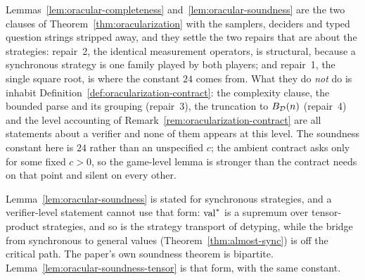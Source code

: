 \begin{remark}
\label{rem:oracular-game-level}
Lemmas~\ref{lem:oracular-completeness} and~\ref{lem:oracular-soundness} are the two clauses of
Theorem~\ref{thm:oracularization} with the samplers, deciders and typed question strings
stripped away, and they settle the two repairs that are about the strategies: repair~2, the
identical measurement operators, is structural, because a synchronous strategy is one family
played by both players; and repair~1, the single square root, is where the constant $24$ comes
from. What they do \emph{not} do is inhabit
Definition~\ref{def:oracularization-contract}: the complexity clause, the bounded parse and its
grouping (repair~3), the truncation to $B_{\mathcal{D}}(n)$ (repair~4) and the level accounting of
Remark~\ref{rem:oracularization-contract} are all statements about a verifier and none of them
appears at this level. The soundness constant here is $24$ rather than an unspecified $c$; the
ambient contract asks only for some fixed $c>0$, so the game-level lemma is stronger than the
contract needs on that point and silent on every other.

Lemma~\ref{lem:oracular-soundness} is stated for synchronous strategies, and a verifier-level
statement cannot use that form: $\mathrm{val}^*$ is a supremum over tensor-product strategies, and so is
the strategy transport of detyping, while the bridge from synchronous to general values
(Theorem~\ref{thm:almost-sync}) is off the critical path. The paper's own soundness theorem is
bipartite. Lemma~\ref{lem:oracular-soundness-tensor} is that form, with the same constant.
\end{remark}

